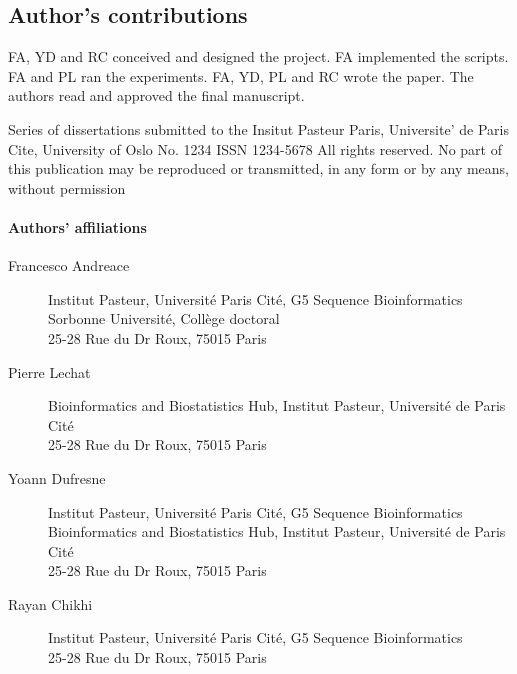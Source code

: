 \subsection*{\textbf{Author's contributions}}
FA, YD and RC conceived and designed the project. FA implemented the scripts. FA and PL ran the experiments. FA, YD, PL and RC wrote the paper. The authors read and approved the final manuscript.


Series of dissertations submitted to the
Insitut Pasteur Paris, Universite’ de Paris Cite, University of Oslo
No. 1234
ISSN 1234-5678
All rights reserved. No part of this publication may be
reproduced or transmitted, in any form or by any means, without permission

\paragraph{Authors' affiliations}
\begin{description}
	\item[Francesco Andreace]
	Institut Pasteur, Université Paris Cité, G5 Sequence Bioinformatics \\
	Sorbonne Université, Collège doctoral \\
	25-28 Rue du Dr Roux, 75015 Paris
	
	
	\item[Pierre Lechat]
	Bioinformatics and Biostatistics Hub, Institut Pasteur, Université de Paris Cité \\
	25-28 Rue du Dr Roux, 75015 Paris
	
	\item[Yoann Dufresne]
	Institut Pasteur, Université Paris Cité, G5 Sequence Bioinformatics \\
	Bioinformatics and Biostatistics Hub, Institut Pasteur, Université de Paris Cité \\
	25-28 Rue du Dr Roux, 75015 Paris
	
	\item[Rayan Chikhi]
	Institut Pasteur, Université Paris Cité, G5 Sequence Bioinformatics \\
	25-28 Rue du Dr Roux, 75015 Paris
\end{description}
\newpage

